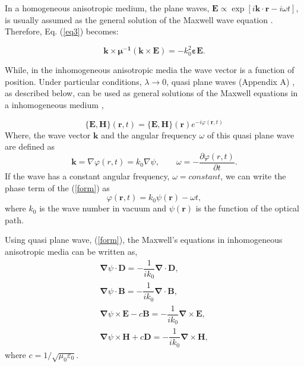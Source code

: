\documentclass[9pt,twocolumn,twoside]{osajnl}
\begin{document}
In a homogeneous anisotropic medium, the plane waves, $ \mathbf{E}\propto \exp\left[i\mathbf{k} \cdot  \mathbf{r}- i\omega t \right]$, is usually assumed as the general solution of the Maxwell wave equation \cite{hao2008electromagnetic}. Therefore, Eq. (\ref{eq3}) becomes:
   
   \begin{equation}\label{w.eq}
	\mathbf{k}\times{\boldsymbol{\mu^{-1}}(\mathbf{k}\times\mathbf{E})}=-k^{2}_{0}\boldsymbol{\varepsilon}\mathbf{E}.
\end{equation}

While, in the inhomogeneous anisotropic media the wave vector is a function of position. Under particular conditions, $\lambda\rightarrow 0$, quasi plane waves (Appendix A) , as described below, can be used as general solutions of the Maxwell equations in a inhomogeneous  medium \cite{born1999principles, sluijter2010ray}, 

\begin{equation} 
\{\mathbf{E,H}\}(\mathbf{r},t)=\{\mathbf{E,H}\}(\mathbf{r})e^{-i\varphi(\mathbf{r},t)}
\label{form}
\end{equation}
 Where, the wave vector $\mathbf{k}$ and the angular frequency $\omega$ of this quasi plane wave are defined as 
\begin{equation}\label{wave}
\mathbf{k}=\nabla{\varphi(r,t)}=k_{0}\nabla{\psi}, \qquad
\omega=-\dfrac{\partial{\varphi(r,t)}}{\partial{t}}.
\end{equation}
If  the wave has a constant angular frequency, $\omega=constant$, we can write the phase term of the (\ref{form}) as 
\begin{equation}
\varphi(\mathbf{r},t)=k_{0}\psi(\mathbf{r})-\omega t ,
\end{equation}
where $k_{0}$  is the wave number in vacuum and $\psi(\mathbf{r})$ is the function of the optical path.

Using quasi plane wave, (\ref{form}), the Maxwell's equations in inhomogeneous anisotropic media can be written as, 
\begin{gather}
\boldsymbol{\nabla}{\psi}\cdot\mathbf{D}=-\dfrac{1}{ik_{0}}\boldsymbol{\nabla}\cdot \mathbf{D}, \nonumber\\
\boldsymbol{\nabla}{\psi}\cdot \mathbf{B}=-\dfrac{1}{ik_{0}}\boldsymbol{\nabla}\cdot \mathbf{B},\nonumber\\
\boldsymbol{\nabla}{\psi}\times\mathbf{E}-c\mathbf{B}=-\dfrac{1}{ik_{0}} \boldsymbol{\nabla}\times\mathbf{E},\nonumber\\
\boldsymbol{\nabla}{\psi}\times\mathbf{H}+c\mathbf{D}=-\dfrac{1}{ik_{0}} \boldsymbol{\nabla}\times\mathbf{H},\label{m.i}
\end{gather}
where $c={1}/{\sqrt{\mu_{0}\varepsilon_{0}}}$.
\end{document}
